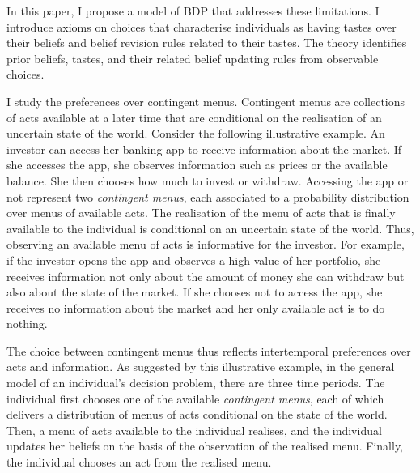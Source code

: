 In this paper, I propose a model of BDP that addresses these limitations. I introduce axioms on choices that characterise individuals as having tastes over their beliefs and belief revision rules related to their tastes. The theory identifies prior beliefs, tastes, and their related belief updating rules from observable choices.

I study the preferences over contingent menus. Contingent menus are collections of acts available at a later time that are conditional on the realisation of an uncertain state of the world. Consider the following illustrative example. An investor can access her banking app to receive information about the market. If she accesses the app, she observes information such as prices or the available balance. She then chooses how much to invest or withdraw. Accessing the app or not represent two \textit{contingent menus}, each associated to a probability distribution over menus of available acts. The realisation of the menu of acts that is finally available to the individual is conditional on an uncertain state of the world. Thus, observing an available menu of acts is informative for the investor. For example, if the investor opens the app and observes a high value of her portfolio, she receives information not only about the amount of money she can withdraw but also about the state of the market. If she chooses not to access the app, she receives no information about the market and her only available act is to do nothing.

The choice between contingent menus thus reflects intertemporal preferences over acts and information. As suggested by this illustrative example, in the general model of an individual's decision problem, there are three time periods. The individual first chooses one of the available \textit{contingent menus}, each of which delivers a distribution of menus of acts conditional on the state of the world. Then, a menu of acts available to the individual realises, and the individual updates her beliefs on the basis of the observation of the realised menu. Finally, the individual chooses an act from the realised menu.


